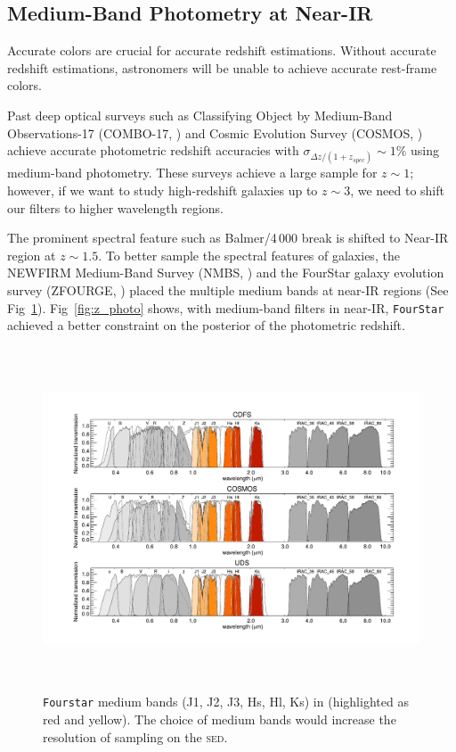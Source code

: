 \documentclass{ar-1col}
\begin{document}
\subsection{Medium-Band Photometry at Near-IR}

Accurate colors are crucial for accurate redshift estimations. 
Without accurate redshift estimations, astronomers will be unable to achieve accurate rest-frame colors.

Past deep optical surveys such as Classifying Object by Medium-Band Observations-17 (COMBO-17, \citet{Wolf2003}) and Cosmic Evolution Survey (COSMOS, \citet{Scoville2007}) achieve accurate photometric redshift accuracies with $ \sigma_{\Delta z / (1 + z_{spec})} \sim 1\% $ using medium-band photometry.
These surveys achieve a large sample for $ z \sim 1 $; however, if we want to study high-redshift galaxies up to $ z \sim 3 $, we need to shift our filters to higher wavelength regions. 

The prominent spectral feature such as Balmer/4\,000 break is shifted to Near-IR region at $ z \sim 1.5 $.
To better sample the spectral features of galaxies, the NEWFIRM Medium-Band Survey (NMBS, \citet{Whitaker2011}) and the FourStar galaxy evolution survey (ZFOURGE, \citet{Straatman2016}) placed the multiple medium bands at near-IR regions (See Fig~\ref{fig:medium_bands}).
Fig~\ref{fig:z_photo} shows, with medium-band filters in near-IR, \texttt{FourStar} achieved a better constraint on the posterior of the photometric redshift. 


\begin{figure}
    \includegraphics[width=6in, height=4in]{images/medium_bands.pdf}
    \caption{\texttt{Fourstar} medium bands (J1, J2, J3, Hs, Hl, Ks) in \citet{Straatman2016} (highlighted as red and yellow). The choice of medium bands would increase the resolution of sampling on the \textsc{sed}.}
    \label{fig:medium_bands}
\end{figure}
\end{document}
